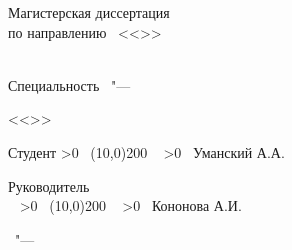 \begin{center}
{%
Магистерская диссертация \\
по направлению \thesisSpecialtyNumber\ 
<<\thesisSpecialtyTitle>>
}
\\
\textbf {%
\thesisTitle}
\\
{\ProgModule}

\vspace{0pt plus2fill} %

\ifdefined\thesisSpecialtyTwoNumber
{%
Специальность \thesisSpecialtyTwoNumber\ "--- 

<<\thesisSpecialtyTwoTitle>>
}
\fi

\vspace{0pt plus2fill} %
\end{center}
%
\vspace{0pt plus4fill} %
\begin{flushleft}

Студент
\newcount\lineblank
{}
\loop
  \message{\ }
    \advance {}
    \ifnum \lineblank>0
    \repeat
\
\line(10,0){200} \
\newcount\mynameblank
{}
\loop
  \message{\ }
    \advance {}
    \ifnum \mynameblank>0
    \repeat
\
Уманский А.А. %

Руководитель\\
\supervisorRegaliaShort
\
\newcount\lineblank
{}
\loop
  \message{\ }
    \advance {}
    \ifnum \lineblank>0
    \repeat
\
\line(10,0){200} \
\newcount\mynameblank
\mynameblank=50
\loop
  \message{\ }
    \advance {}
    \ifnum \mynameblank>0
    \repeat
\
Кононова А.И.

\end{flushleft}

%
\vspace{0pt plus4fill} %
{\centering\thesisCity\ "--- \thesisYear\par}
